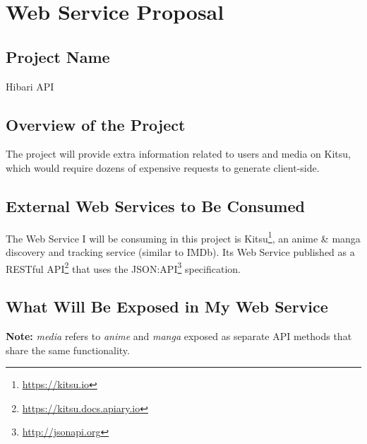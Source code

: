 \chapter{Web Service Proposal}
\section{Project Name}

Hibari API

\section{Overview of the Project}

The project will provide extra information  related to users and media on Kitsu, which would require dozens of expensive requests to generate client-side.

\section{External Web Services to Be Consumed}

The Web Service I will be consuming in this project is Kitsu\footnote{\url{https://kitsu.io}}, an anime \& manga discovery and tracking service (similar to IMDb). Its Web Service published as a RESTful API\footnote{\url{https://kitsu.docs.apiary.io}} that uses the JSON:API\footnote{\url{http://jsonapi.org}} specification.

\section{What Will Be Exposed in My Web Service}

\textbf{Note:} \textit{media} refers to \textit{anime} and \textit{manga} exposed as separate API methods that share the same functionality.

